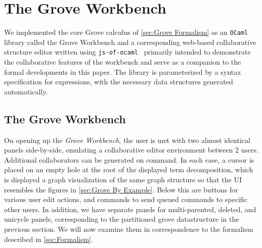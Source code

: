 
\section{The Grove Workbench}%
\label{sec:Implementation}

We implemented the core Grove calculus of \autoref{sec:Grove Formalism} as an \texttt{OCaml} library called the Grove Workbench and a corresponding web-based collaborative structure editor written using \texttt{js-of-ocaml}~\cite{DBLP:journals/spe/VouillonB14} primarily intended to demonstrate the collaborative features of the workbench and serve as a companion to the formal developments in this paper. The library is parameterized by a syntax specification for expressions, with the necessary data structures generated automatically.

\subsection{The Grove Workbench}
\label{sub:impl-grv}

On opening up the \emph{Grove Workbench}, the user is met with two almost identical panels side-by-side, emulating a collaborative editor environment between 2 users. Additional collaborators can be generated on command. In each case, a cursor is placed on an empty hole at the root of the displayed term decomposition, which is displayed a graph visualization of the same graph structure so that the UI resembles the figures in \autoref{sec:Grove By Example}. Below this are buttons for various user edit actions, and commands to send queued commands to specific other users. In addition, we have separate panels for multi-parented, deleted, and unicycle panels, corresponding to the partitioned grove datastructure in the previous section. We will now examine them in correspondence to the formalism described in \autoref{sec:Formalism}. 



